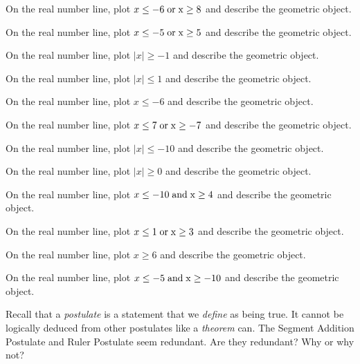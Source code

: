 \documentclass[12pt]{article}
\newenvironment{problem}[2][Problem]{\begin{trivlist}
			\item[\hskip \labelsep {\bfseries #1}\hskip \labelsep {\bfseries #2.}]}{\end{trivlist}}
\begin{document}
			\begin{problem}{0} 
On the real number line, plot $ x \leq -6 \;\rm{ or }\; x \geq 8$ and describe the geometric object.
 \end{problem}\begin{problem}{1} 
On the real number line, plot $ x \leq -5 \;\rm{ or }\; x \geq 5$ and describe the geometric object.
 \end{problem}\begin{problem}{2} 
On the real number line, plot $\mid x\mid \geq -1$ and describe the geometric object.
 \end{problem}\begin{problem}{3} 
On the real number line, plot $\mid x\mid \leq 1$ and describe the geometric object.
 \end{problem}\begin{problem}{4} 
On the real number line, plot $x \leq -6$ and describe the geometric object.
 \end{problem}\begin{problem}{5} 
On the real number line, plot $ x \leq 7 \;\rm{ or }\; x \geq -7$ and describe the geometric object.
 \end{problem}\begin{problem}{6} 
On the real number line, plot $\mid x\mid \leq -10$ and describe the geometric object.
 \end{problem}\begin{problem}{7} 
On the real number line, plot $\mid x\mid \geq 0$ and describe the geometric object.
 \end{problem}\begin{problem}{8} 
On the real number line, plot $ x \leq -10 \;\rm{ and }\; x \geq 4$ and describe the geometric object.
 \end{problem}\begin{problem}{9} 
On the real number line, plot $ x \leq 1 \;\rm{ or }\; x \geq 3$ and describe the geometric object.
 \end{problem}\begin{problem}{10} 
On the real number line, plot $x \geq 6$ and describe the geometric object.
 \end{problem}\begin{problem}{11} 
On the real number line, plot $ x \leq -5 \;\rm{ and }\; x \geq -10$ and describe the geometric object.
 \end{problem}\begin{problem}{Challenge} 

	Recall that a \textit{postulate} is a statement that we \textit{define} as being true. It cannot
	be logically deduced from other postulates like a \textit{theorem} can.
	The Segment Addition Postulate and Ruler Postulate seem redundant. Are they redundant? Why or why not?
	
 \end{problem}
\end{document}
